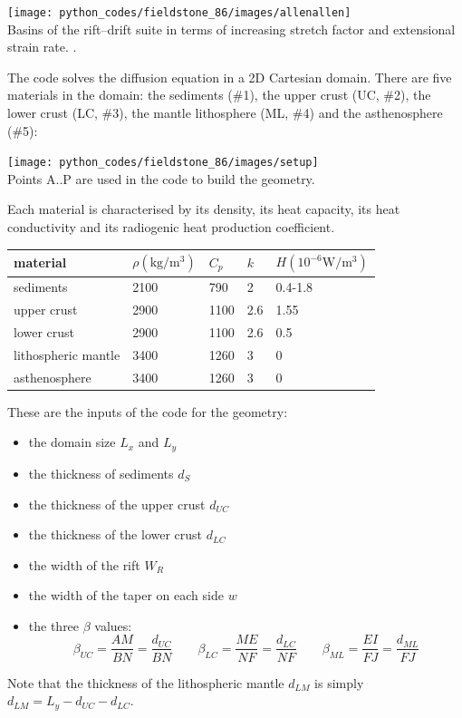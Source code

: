 \begin{center}
\texttt{[image: python\_codes/fieldstone\_86/images/allenallen]}\\
{\captionfont Basins of the rift–drift suite in terms of increasing stretch factor 
and extensional strain rate. \cite{allen2013}.} 
\end{center}

The code solves the diffusion equation in a 2D Cartesian domain. There are 
five materials in the domain: the sediments (\#1), the upper crust (UC, \#2), 
the lower crust (LC, \#3), the mantle lithosphere (ML, \#4) and the asthenosphere (\#5):

\begin{center}
\texttt{[image: python\_codes/fieldstone\_86/images/setup]}\\
{\captionfont Points A..P are used in the code to build the geometry.}
\end{center}

Each material is characterised by its density, its heat capacity, its heat conductivity
and its radiogenic heat production coefficient.

\begin{center}
\begin{tabular}{lllll}
\hline
material & $\rho (\si{\kilogram\per\cubic\metre})$ & $C_p$ & $k$ & $H (10^{-6}\si{\watt\per\cubic\meter})$ \\
\hline
\hline
sediments           & 2100 & 790  & 2   & 0.4-1.8\\ 
upper crust         & 2900 & 1100 & 2.6 & 1.55\\ 
lower crust         & 2900 & 1100 & 2.6 & 0.5\\ 
lithospheric mantle & 3400 & 1260 & 3   & 0\\ 
asthenosphere       & 3400 & 1260 & 3   & 0\\ 
\hline
\end{tabular}
\end{center}


These are the inputs of the code for the geometry:
\begin{itemize}
\item the domain size $L_x$ and $L_y$
\item the thickness of sediments $d_S$
\item the thickness of the upper crust $d_{UC}$
\item the thickness of the lower crust $d_{LC}$
\item the width of the rift $W_R$
\item the width of the taper on each side $w$
\item the three $\beta$ values:
\[
\beta_{UC} =\frac{AM}{BN} =\frac{d_{UC}}{BN}
\qquad
\beta_{LC} =\frac{ME}{NF} =\frac{d_{LC}}{NF}
\qquad 
\beta_{ML} =\frac{EI}{FJ} =\frac{d_{ML}}{FJ}
\]
\end{itemize}
Note that the thickness of the lithospheric mantle $d_{LM}$ is simply $d_{LM}=L_y-d_{UC}-d_{LC}$.

